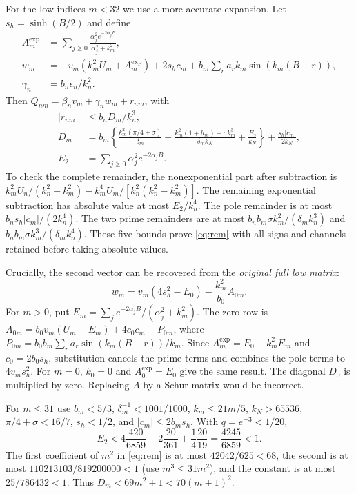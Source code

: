 \documentclass[11pt]{article}
\begin{document}
For the low indices $m<32$ we use a more accurate expansion. Let $s_h=\sinh(B/2)$ and define
\begin{align}
 A_m^{\exp}&=\sum_{j\ge0}\frac{\alpha_j^2e^{-2\alpha_jB}}{\alpha_j^2+k_m^2},\nonumber\\
 w_m&=-v_m(k_m^2U_m+A_m^{\exp})+2s_hc_m
       +b_m\sum_ra_rk_m\sin(k_m(B-r)),\nonumber\\
 \gamma_n&=b_n\epsilon_n/k_n^2.
\end{align}
Then $Q_{nm}=\beta_nv_m+\gamma_nw_m+r_{nm}$, with
\begin{align}
 |r_{nm}|&\le b_nD_m/k_n^3,\label{eq:rem}\\
 D_m&=b_m\left\{\frac{k_m^2(\pi/4+\sigma)}{\delta_m}
 +\frac{k_m^2(1+h_m)+\sigma k_m^3}{\delta_mk_N}
 +\frac{E_2}{k_N}\right\}+\frac{s_h|c_m|}{2k_N},\nonumber\\
 E_2&=\sum_{j\ge0}\alpha_j^2e^{-2\alpha_jB}.\nonumber
\end{align}
To check the complete remainder, the nonexponential part after subtraction is
$k_m^2U_n/(k_n^2-k_m^2)-k_m^4U_m/[k_n^2(k_n^2-k_m^2)]$.
The remaining exponential subtraction has absolute value at most $E_2/k_n^4$. The pole remainder is at most $b_ns_h|c_m|/(2k_n^4)$. The two prime remainders are at most $b_nb_m\sigma k_m^2/(\delta_mk_n^3)$ and $b_nb_m\sigma k_m^3/(\delta_mk_n^4)$. These five bounds prove \eqref{eq:rem} with all signs and channels retained before taking absolute values.

Crucially, the second vector can be recovered from the \emph{original full low matrix}:
\begin{equation}
 w_m=v_m(4s_h^2-E_0)-\frac{k_m^2}{b_0}A_{0m}.\label{eq:w}
\end{equation}
For $m>0$, put $E_m=\sum_j e^{-2\alpha_jB}/(\alpha_j^2+k_m^2)$. The zero row is
$A_{0m}=b_0v_m(U_m-E_m)+4c_0c_m-P_{0m}$, where
$P_{0m}=b_0b_m\sum_ra_r\sin(k_m(B-r))/k_m$.
Since $A_m^{\exp}=E_0-k_m^2E_m$ and $c_0=2b_0s_h$, substitution cancels the prime terms and combines the pole terms to $4v_ms_h^2$. For $m=0$, $k_0=0$ and $A_0^{\exp}=E_0$ give the same result. The diagonal $D_0$ is multiplied by zero. Replacing $A$ by a Schur matrix would be incorrect.

For $m\le31$ use $b_m<5/3$, $\delta_m^{-1}<1001/1000$, $k_m\le21m/5$, $k_N>65536$, $\pi/4+\sigma<16/7$, $s_h<1/2$, and $|c_m|\le2b_ms_h$. With $q=e^{-3}<1/20$,
\[
 E_2<4\frac{420}{6859}+2\frac{20}{361}+\frac14\frac{20}{19}
 =\frac{4245}{6859}<1.
\]
The first coefficient of $m^2$ in \eqref{eq:rem} is at most $42042/625<68$, the second is at most $110213103/819200000<1$ (use $m^3\le31m^2$), and the constant is at most $25/786432<1$. Thus $D_m<69m^2+1<70(m+1)^2$.
\end{document}
